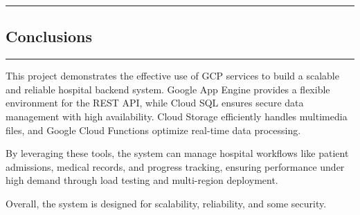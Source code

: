{\color{gray}\hrule}
\begin{center}
\section{Conclusions}
\bigskip
\end{center}
{\color{gray}\hrule}
\vspace{0.5cm}
This project demonstrates the effective use of GCP services to build a scalable and reliable hospital backend system. Google App Engine provides a flexible environment for the REST API, while Cloud SQL ensures secure data management with high availability. Cloud Storage efficiently handles multimedia files, and Google Cloud Functions optimize real-time data processing.

By leveraging these tools, the system can manage hospital workflows like patient admissions, medical records, and progress tracking, ensuring performance under high demand through load testing and multi-region deployment. 

Overall, the system is designed for scalability, reliability, and some security.